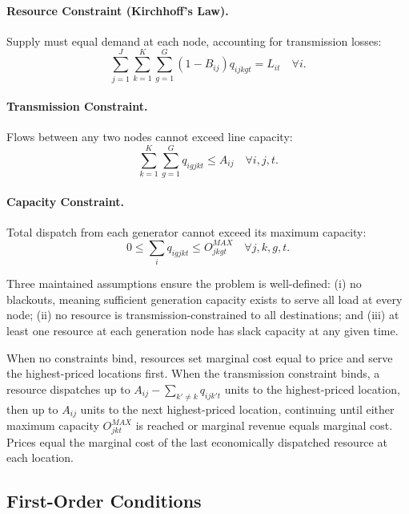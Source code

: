 \documentclass[12pt]{article}
\begin{document}
\paragraph{Resource Constraint (Kirchhoff's Law).} Supply must equal demand at each node, accounting for transmission losses:
\begin{equation} \label{Budget_Constraint_appendix} \sum_{j=1}^J\sum_{k=1}^K \sum_{g=1}^G (1-B_{ij})q_{ijkgt}=L_{it} \quad \forall i. \end{equation}

\paragraph{Transmission Constraint.} Flows between any two nodes cannot exceed line capacity:
\begin{equation} \sum_{k=1}^K \sum_{g=1}^G q_{igjkt}\leq A_{ij} \quad \forall i,j,t. \end{equation}

\paragraph{Capacity Constraint.} Total dispatch from each generator cannot exceed its maximum capacity:
\begin{equation}
0\leq \sum_{i} q_{igjkt}\leq O_{jkgt}^{MAX} \quad \forall j,k,g,t.
\end{equation}

Three maintained assumptions ensure the problem is well-defined: (i) no blackouts, meaning sufficient generation capacity exists to serve all load at every node; (ii) no resource is transmission-constrained to all destinations; and (iii) at least one resource at each generation node has slack capacity at any given time.

When no constraints bind, resources set marginal cost equal to price and serve the highest-priced locations first. When the transmission constraint binds, a resource dispatches up to $A_{ij} - \sum_{k' \neq k} q_{ijk't}$ units to the highest-priced location, then up to $A_{ij}$ units to the next highest-priced location, continuing until either maximum capacity $O_{jkt}^{MAX}$ is reached or marginal revenue equals marginal cost. Prices equal the marginal cost of the last economically dispatched resource at each location.

\subsection{First-Order Conditions}\label{app:focs}
\end{document}
